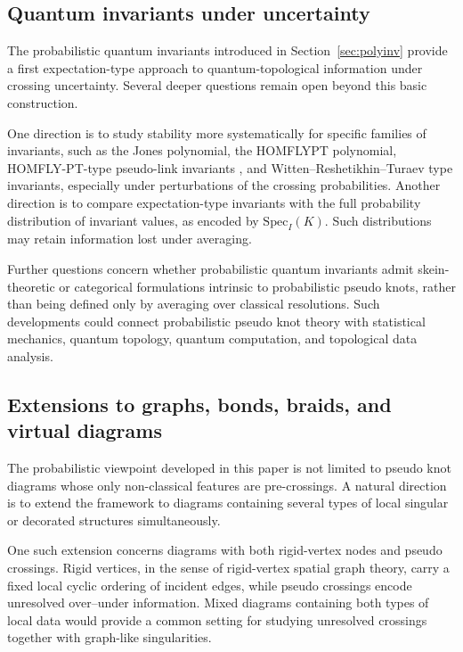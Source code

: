 \documentclass[a4paper, reqno, 12pt]{amsart}
\theoremstyle{plain}
\theoremstyle{definition}
\begin{document}
\subsection{Quantum invariants under uncertainty}

The probabilistic quantum invariants introduced in Section~\ref{sec:polyinv} provide a first expectation-type approach to quantum-topological information under crossing uncertainty. Several deeper questions remain open beyond this basic construction.

One direction is to study stability more systematically for specific families of invariants, such as the Jones polynomial, the HOMFLYPT polynomial, HOMFLY-PT-type pseudo-link invariants \cite{D1}, and Witten--Reshetikhin--Turaev type invariants, especially under perturbations of the crossing probabilities. Another direction is to compare expectation-type invariants with the full probability distribution of invariant values, as encoded by \(\mathrm{Spec}_I(K)\). Such distributions may retain information lost under averaging.

Further questions concern whether probabilistic quantum invariants admit skein-theoretic or categorical formulations intrinsic to probabilistic pseudo knots, rather than being defined only by averaging over classical resolutions. Such developments could connect probabilistic pseudo knot theory with statistical mechanics, quantum topology, quantum computation, and topological data analysis.


\subsection{Extensions to graphs, bonds, braids, and virtual diagrams}

The probabilistic viewpoint developed in this paper is not limited to pseudo knot diagrams whose only non-classical features are pre-crossings. A natural direction is to extend the framework to diagrams containing several types of local singular or decorated structures simultaneously.

One such extension concerns diagrams with both rigid-vertex nodes and pseudo crossings. Rigid vertices, in the sense of rigid-vertex spatial graph theory, carry a fixed local cyclic ordering of incident edges, while pseudo crossings encode unresolved over--under information. Mixed diagrams containing both types of local data would provide a common setting for studying unresolved crossings together with graph-like singularities.
\end{document}
